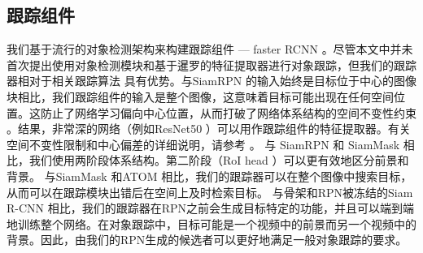 \subsection{跟踪组件}

我们基于流行的对象检测架构来构建跟踪组件 --- faster RCNN \cite{ren2015faster}。尽管本文中并未首次提出使用对象检测模块和基于暹罗的特征提取器进行对象跟踪，但我们的跟踪器相对于相关跟踪算法 \cite{SiamRPN, Wang2018SiamMask, danelljan2019atom, voigtlaender2019siam}具有优势。与SiamRPN \cite{SiamRPN}的输入始终是目标位于中心的图像块相比，我们跟踪组件的输入是整个图像，这意味着目标可能出现在任何空间位置。这防止了网络学习偏向中心位置，从而打破了网络体系结构的空间不变性约束 \cite{SiamRPN++} 。结果，非常深的网络（例如ResNet50 \cite{he2016deep}）可以用作跟踪组件的特征提取器。有关空间不变性限制和中心偏差的详细说明，请参考 \cite{SiamRPN++}。
与 SiamRPN \cite{SiamRPN} 和 SiamMask \cite{Wang2018SiamMask} 相比，我们使用两阶段体系结构。第二阶段（RoI head \cite{ren2015faster}）可以更有效地区分前景和背景。
与SiamMask \cite{Wang2018SiamMask} 和ATOM \cite{danelljan2019atom}相比，我们的跟踪器可以在整个图像中搜索目标，从而可以在跟踪模块出错后在空间上及时检索目标。
与骨架和RPN被冻结的Siam R-CNN \cite{voigtlaender2019siam}相比，我们的跟踪器在RPN之前会生成目标特定的功能，并且可以端到端地训练整个网络。在对象跟踪中，目标可能是一个视频中的前景而另一个视频中的背景。因此，由我们的RPN生成的候选者可以更好地满足一般对象跟踪的要求。


